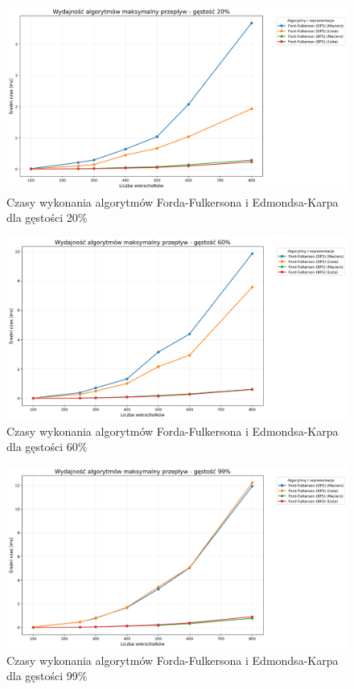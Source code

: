 \documentclass{article}
\begin{document}
\begin{figure}[H]
    \centering
    \includegraphics[scale=0.4]{../Python/charts_type2/Typ2_MAX_FLOW_gestosc20_wykres.png}
    \caption{Czasy wykonania algorytmów Forda-Fulkersona i Edmondsa-Karpa dla gęstości 20\%}
\end{figure}
\begin{figure}[H]
    \centering
    \includegraphics[scale=0.4]{../Python/charts_type2/Typ2_MAX_FLOW_gestosc60_wykres.png}
    \caption{Czasy wykonania algorytmów Forda-Fulkersona i Edmondsa-Karpa dla gęstości 60\%}
\end{figure}

\begin{figure}[H]
    \centering
    \includegraphics[scale=0.4]{../Python/charts_type2/Typ2_MAX_FLOW_gestosc99_wykres.png}
    \caption{Czasy wykonania algorytmów Forda-Fulkersona i Edmondsa-Karpa dla gęstości 99\%}
\end{figure}
\end{document}
